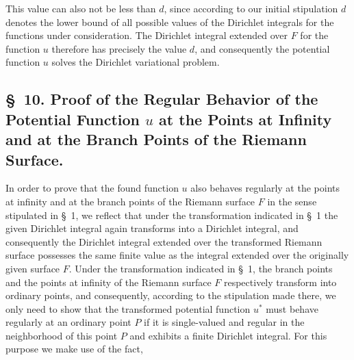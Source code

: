 \documentclass{article}
\begin{document}
This value can also not be less than $d$, since according to our initial stipulation $d$ denotes the lower bound of all possible values of the Dirichlet integrals for the functions under consideration. The Dirichlet integral extended over $F$ for the function $u$ therefore has precisely the value $d$, and consequently the potential function $u$ solves the Dirichlet variational problem.

\subsection*{§~10. Proof of the Regular Behavior of the Potential Function $u$ at the Points at Infinity and at the Branch Points of the Riemann Surface.}

In order to prove that the found function $u$ also behaves regularly at the points at infinity and at the branch points of the Riemann surface $F$ in the sense stipulated in §~1, we reflect that under the transformation indicated in §~1 the given Dirichlet integral again transforms into a Dirichlet integral, and consequently the Dirichlet integral extended over the transformed Riemann surface possesses the same finite value as the integral extended over the originally given surface $F$. Under the transformation indicated in §~1, the branch points and the points at infinity of the Riemann surface $F$ respectively transform into ordinary points, and consequently, according to the stipulation made there, we only need to show that the transformed potential function $u^*$ must behave regularly at an ordinary point $P$ if it is single-valued and regular in the neighborhood of this point $P$ and exhibits a finite Dirichlet integral. For this purpose we make use of the fact,
\end{document}
